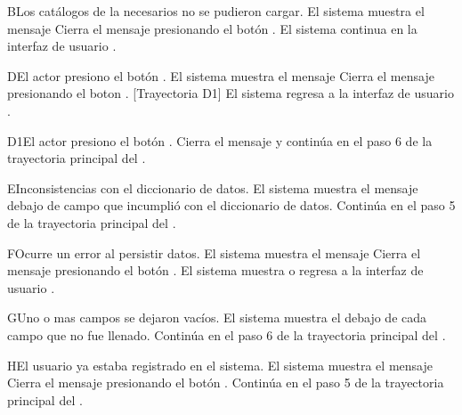 \begin{UCtrayectoriaA}{B}{Los catálogos de la  necesarios no se pudieron cargar.}
	\UCpaso El sistema muestra el mensaje 
	\UCpaso[\UCactor] Cierra el mensaje presionando el botón .
	\UCpaso El sistema continua en la interfaz de usuario .
\end{UCtrayectoriaA}



\begin{UCtrayectoriaA}{D}{El actor presiono el botón .}
	\UCpaso El sistema muestra el mensaje 
	\UCpaso[\UCactor] Cierra el mensaje presionando el boton . [Trayectoria D1]
	\UCpaso El sistema regresa a la interfaz de usuario .
\end{UCtrayectoriaA}

	\begin{UCtrayectoriaA}{D1}{El actor presiono el botón .}
	\UCpaso Cierra el mensaje y continúa en el paso 6 de la trayectoria principal del .	
\end{UCtrayectoriaA}

\begin{UCtrayectoriaA}{E}{Inconsistencias con el diccionario de datos.}
	\UCpaso El sistema muestra el mensaje  debajo de campo que incumplió con el diccionario de datos.
	\UCpaso Continúa en el paso 5 de la trayectoria principal del .
\end{UCtrayectoriaA}


\begin{UCtrayectoriaA}{F}{Ocurre un error al persistir datos.}
	\UCpaso El sistema muestra el mensaje 
	\UCpaso[\UCactor] Cierra el mensaje presionando el botón .
	\UCpaso El sistema muestra o regresa a la interfaz de usuario  .
\end{UCtrayectoriaA}




\begin{UCtrayectoriaA}{G}{Uno o mas campos se dejaron vacíos.}
	\UCpaso El sistema muestra el  debajo de cada campo que no fue llenado. 
	\UCpaso	Continúa en el paso 6 de la trayectoria principal del .
\end{UCtrayectoriaA}

\begin{UCtrayectoriaA}{H}{El usuario ya estaba registrado en el sistema.}
	\UCpaso El sistema muestra el mensaje  
	\UCpaso[\UCactor] Cierra el mensaje presionando el botón .
	\UCpaso Continúa en el paso 5 de la trayectoria principal del .
\end{UCtrayectoriaA}
